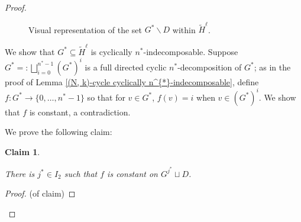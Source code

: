 \documentclass{amsart}
\newtheorem{claim}[theorem]{Claim}
\theoremstyle{definition}
\theoremstyle{remark}
\numberwithin{equation}{section}
\begin{document}
\begin{proof}
\begin{figure}[hbt!]
\caption{Visual representation of the set $G^{*}\backslash D$ within $\tilde{H}^{\ell}$.}


\label{parallelogram}
\end{figure}


We show that $G^{*} \subseteq \tilde{H}^{\ell}$ is cyclically $n^{*}$-indecomposable. Suppose $G^{*}=:\bigsqcup^{n^{*}-1}_{i =0} (G^{*})^{i}$ is a full directed cyclic $n^{*}$-decomposition of $G^{*}$; as in the proof of Lemma \ref{(N, k)-cycle cyclically n^{*}-indecomposable}, define $f: G^{*} \to \{0, \ldots, n^{*}-1\}$ so that for $v \in G^{*}$, $f(v) =i$ when $v \in (G^{*})^{i}$. We show that $f$ is constant, a contradiction.

We prove the following claim:

\begin{claim}\label{monochromatic column}

There is $j^{*} \in I_{2}$ such that $f$ is constant on $G^{j^{*}} \sqcup D$.

    
\end{claim}

\begin{proof}(of claim)
    
    
    

\end{proof}
\end{proof}
\end{document}

